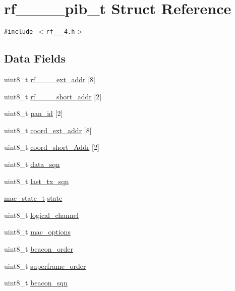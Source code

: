 \hypertarget{structrf__802__15__4__pib__t}{
\section{rf\_\_\_\_\-pib\_\-t Struct Reference}
\label{structrf__802__15__4__pib__t}
}
{\tt \#include $<$rf\_\_\_\-4.h$>$}

\subsection*{Data Fields}
\begin{CompactItemize}
\item 
uint8\_\-t \hyperlink{structrf__802__15__4__pib__t_ada75ac4d0156c4b98bafee8b33447d6}{rf\_\_\_\_\-ext\_\-addr} \mbox{[}8\mbox{]}
\item 
uint8\_\-t \hyperlink{structrf__802__15__4__pib__t_14fd95a363f5d5c7a2c9e0a55fa73c92}{rf\_\_\_\_\-short\_\-addr} \mbox{[}2\mbox{]}
\item 
uint8\_\-t \hyperlink{structrf__802__15__4__pib__t_a3a25fd64e439278076803b8649074c1}{pan\_\-id} \mbox{[}2\mbox{]}
\item 
uint8\_\-t \hyperlink{structrf__802__15__4__pib__t_7b60ab2c7b0a52c40f5dd366d9cae943}{coord\_\-ext\_\-addr} \mbox{[}8\mbox{]}
\item 
uint8\_\-t \hyperlink{structrf__802__15__4__pib__t_0bf213a8ed84006ff69a764f07d09b85}{coord\_\-short\_\-Addr} \mbox{[}2\mbox{]}
\item 
uint8\_\-t \hyperlink{structrf__802__15__4__pib__t_48f4794258b60399b861fb91fe95dbb0}{data\_\-sqn}
\item 
uint8\_\-t \hyperlink{structrf__802__15__4__pib__t_733aa4f7ba363cb83eb06e9c95d3fcc4}{last\_\-tx\_\-sqn}
\item 
\hyperlink{rf__802__15__4_8h_222287b6ac933745e39ca393bb0cfe4f}{mac\_\-state\_\-t} \hyperlink{structrf__802__15__4__pib__t_5919614e012e3cd8e90963e484f0a5c7}{state}
\item 
uint8\_\-t \hyperlink{structrf__802__15__4__pib__t_dddfdd709fd10c0f6905935cf79e70cd}{logical\_\-channel}
\item 
uint8\_\-t \hyperlink{structrf__802__15__4__pib__t_ea80646f1870b4a766d8859c8d335d3f}{mac\_\-options}
\item 
uint8\_\-t \hyperlink{structrf__802__15__4__pib__t_9a5cae51885b5106357388a53dff4fd0}{beacon\_\-order}
\item 
uint8\_\-t \hyperlink{structrf__802__15__4__pib__t_a1f33d99ac1287bc5c3616f4d3a5ab55}{superframe\_\-order}
\item 
uint8\_\-t \hyperlink{structrf__802__15__4__pib__t_766db8ff5040236ae2df52cb2c14cb0a}{beacon\_\-sqn}
\end{CompactItemize}


